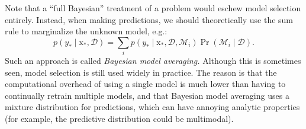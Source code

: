 \documentclass{article}
\newcommand{\given}{\mid}
\newcommand{\mc}[1]{\mathcal{#1}}
\newcommand{\data}{\mc{D}}
\newcommand{\model}{\mc{M}}
\renewcommand{\vec}[1]{\bm{\mathrm{#1}}}
\begin{document}
Note that a ``full Bayesian'' treatment of a problem would eschew
model selection entirely.  Instead, when making predictions, we should
theoretically use the sum rule to marginalize the unknown model, e.g.:
\begin{equation*}
  p(y_\ast \given \vec{x}_\ast, \data)
  =
  \sum_i
  p(y_\ast \given \vec{x}_\ast, \data, \model_i)
  \Pr(\model_i \given \data).
\end{equation*}
Such an approach is called \emph{Bayesian model averaging.}  Although
this is sometimes seen, model selection is still used widely in
practice.  The reason is that the computational overhead of using a
single model is much lower than having to continually retrain multiple
models, and that Bayesian model averaging uses a mixture distribution
for predictions, which can have annoying analytic properties (for
example, the predictive distribution could be multimodal).
\end{document}
